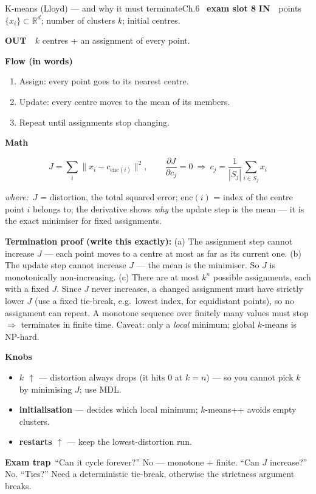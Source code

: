 \documentclass[9pt,a4paper]{extarticle}
\newcommand{\IN}{\textbf{\color{cIn}IN}\ }
\newcommand{\OUT}{\par\textbf{\color{cOut}OUT}\ }
\newcommand{\FLOW}{\par\smallskip\textbf{Flow (in words)}\par\nopagebreak}
\newcommand{\MATH}{\par\smallskip\textbf{Math}\par\nopagebreak}
\newcommand{\KNOBS}{\par\smallskip\textbf{Knobs}\par\nopagebreak}
\newcommand{\TRAP}{\par\smallskip\textbf{\color{cTrap}Exam trap}\ }
\newcommand{\WHERE}{\par\textit{where:}\ }
\newcommand{\up}{$\uparrow$}
\newcommand{\kn}[2]{\item \textbf{#1} --- #2}
\begin{document}
\begin{card}{K-means (Lloyd) --- and why it must terminate}{Ch.6 \textbullet\ \textbf{exam slot 8}}
\IN\ points $\{x_i\}\subset\mathbb R^d$; number of clusters $k$; initial centres.
\OUT\ $k$ centres $+$ an assignment of every point.

\FLOW
\begin{enumerate}
  \item Assign: every point goes to its nearest centre.
  \item Update: every centre moves to the mean of its members.
  \item Repeat until assignments stop changing.
\end{enumerate}

\MATH
\[ J=\sum_i\|x_i-c_{\mathrm{enc}(i)}\|^2,\qquad \frac{\partial J}{\partial c_j}=0\ \Rightarrow\ c_j=\frac{1}{|S_j|}\sum_{i\in S_j}x_i \]
\WHERE $J$ = distortion, the total squared error; $\mathrm{enc}(i)$ = index of the centre point $i$ belongs to; the derivative shows \emph{why} the update step is the mean --- it is the exact minimiser for fixed assignments.

\smallskip
\textbf{Termination proof (write this exactly):} (a) The assignment step cannot increase $J$ --- each point moves to a centre at most as far as its current one. (b) The update step cannot increase $J$ --- the mean is the minimiser. So $J$ is monotonically non-increasing. (c) There are at most $k^n$ possible assignments, each with a fixed $J$. Since $J$ never increases, a changed assignment must have strictly lower $J$ (use a fixed tie-break, e.g.\ lowest index, for equidistant points), so no assignment can repeat. A monotone sequence over finitely many values must stop $\Rightarrow$ terminates in finite time. Caveat: only a \emph{local} minimum; global $k$-means is NP-hard.

\KNOBS
\begin{itemize}
  \kn{$k$ \up}{distortion always drops (it hits 0 at $k=n$) --- so you cannot pick $k$ by minimising $J$; use MDL.}
  \kn{initialisation}{decides which local minimum; $k$-means++ avoids empty clusters.}
  \kn{restarts \up}{keep the lowest-distortion run.}
\end{itemize}
\TRAP ``Can it cycle forever?'' No --- monotone $+$ finite. ``Can $J$ increase?'' No. ``Ties?'' Need a deterministic tie-break, otherwise the strictness argument breaks.
\end{card}

\end{document}
